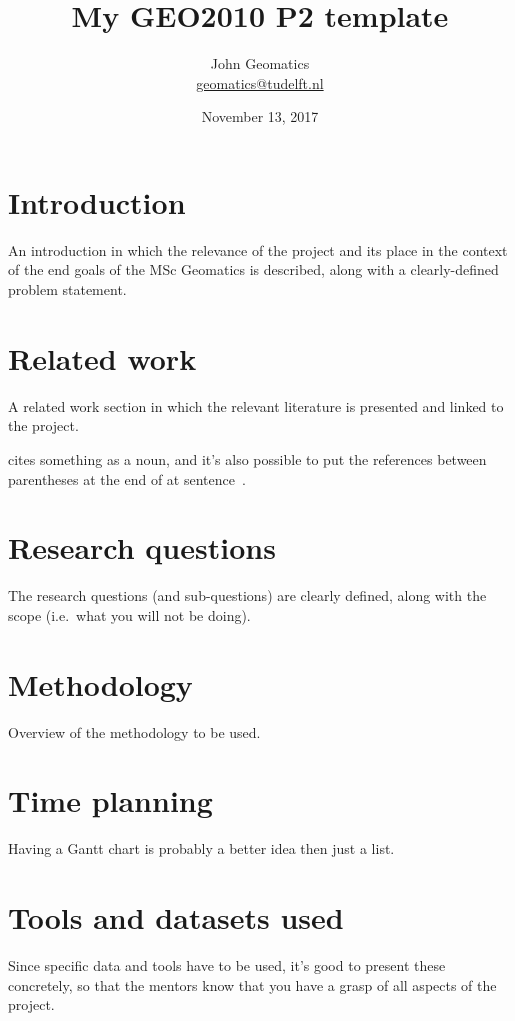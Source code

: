 \documentclass[a4paper,11pt]{scrartcl}
\title{My GEO2010 P2 template}
\author{John Geomatics\\ \url{geomatics@tudelft.nl}}
\date{November 13, 2017}
\newcommand{\ie}{i.e.}
\begin{document}
	
	\maketitle
	
	
	\section{Introduction}
	An introduction in which the relevance of the project and its place in the context of the end goals of the MSc Geomatics is described, along with a clearly-defined problem statement.
	
	\section{Related work}
	A related work section in which the relevant literature is presented and linked to the project.
	
	\citet{Delaunay34} cites something as a noun, and it's also possible to put the references between parentheses at the end of at sentence~\citep{Voronoi08}.
	
	\section{Research questions}
	The research questions (and sub-questions) are clearly defined, along with the scope (\ie\ what you will not be doing).
	
	
	\section{Methodology}
	Overview of the methodology to be used.
	
	\section{Time planning}
	Having a Gantt chart is probably a better idea then just a list.
	
	\section{Tools and datasets used}
	Since specific data and tools have to be used, it’s good to present these concretely, so that the mentors know that you have a grasp of all aspects of the project.
	
	
	
	
\end{document}
